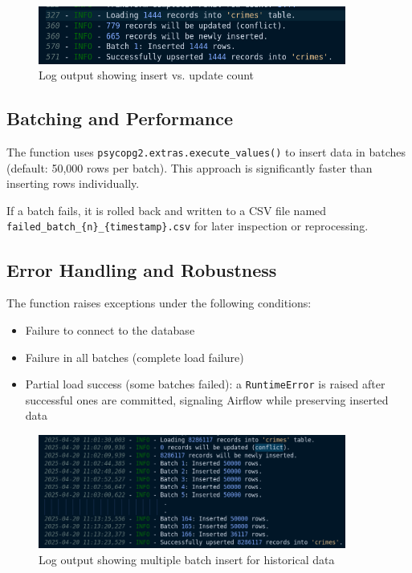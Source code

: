 \documentclass[12pt]{article}
\begin{document}
\begin{figure}[h!]
    \centering
    \includegraphics[width=0.9\textwidth]{figures/load_logs.png}
    \caption{Log output showing insert vs. update count}
    \label{fig:load_log}
\end{figure}

\subsection*{Batching and Performance}
The function uses \texttt{psycopg2.extras.execute\_values()} to insert data in batches (default: 50,000 rows per batch). This approach is significantly faster than inserting rows individually.

If a batch fails, it is rolled back and written to a CSV file named
\texttt{failed\_batch\_\{n\}\_\{timestamp\}.csv} for later inspection or reprocessing.

\subsection*{Error Handling and Robustness}
The function raises exceptions under the following conditions:
\begin{itemize}
    \item Failure to connect to the database
    \item Failure in all batches (complete load failure)
    \item Partial load success (some batches failed): a \texttt{RuntimeError} is raised after successful ones are committed, signaling Airflow while preserving inserted data
\end{itemize}

\begin{figure}[h!]
    \centering
    \includegraphics[width=0.9\textwidth]{figures/load_logs_batched.png}
    \caption{Log output showing multiple batch insert for historical data}
    \label{fig:load_log_batched}
\end{figure}
\end{document}
